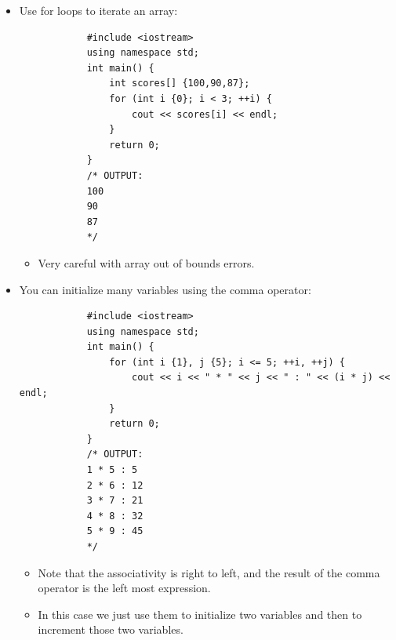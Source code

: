 \begin{itemize}
    \item Use for loops to iterate an array: 
        \begin{verbatim}
            #include <iostream>
            using namespace std;
            int main() {
                int scores[] {100,90,87};
                for (int i {0}; i < 3; ++i) {
                    cout << scores[i] << endl;
                }
                return 0;
            }
            /* OUTPUT:
            100
            90
            87
            */
        \end{verbatim}
        \begin{itemize}
            \item Very careful with array out of bounds errors.
        \end{itemize}
    
    \item You can initialize many variables using the comma operator:
        \begin{verbatim}
            #include <iostream>
            using namespace std;
            int main() {
                for (int i {1}, j {5}; i <= 5; ++i, ++j) {
                    cout << i << " * " << j << " : " << (i * j) << endl;
                }
                return 0;
            }
            /* OUTPUT:
            1 * 5 : 5
            2 * 6 : 12
            3 * 7 : 21
            4 * 8 : 32
            5 * 9 : 45
            */
        \end{verbatim}
        \begin{itemize}
            \item Note that the associativity is right to left, and the result of the comma operator is the left most expression.
            \item In this case we just use them to initialize two variables and then to increment those two variables.
        \end{itemize}
\end{itemize}


